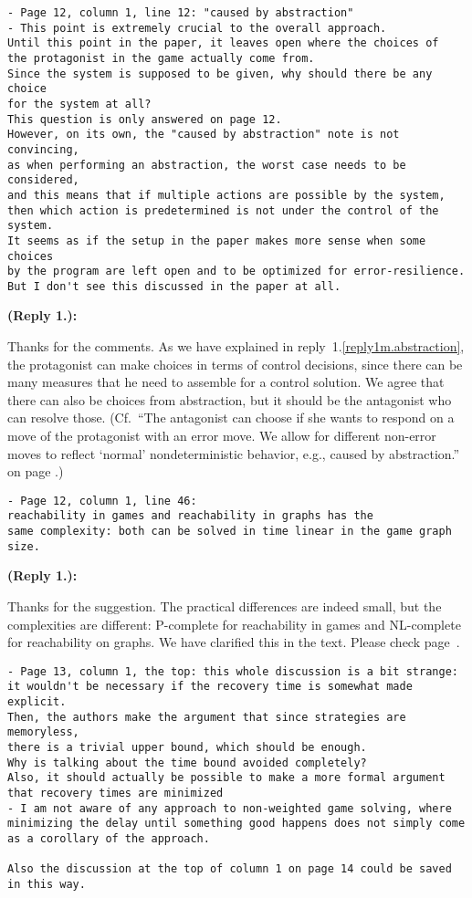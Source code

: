 \documentclass[times,10pt,twocolumn]{article}
\newcounter{cabbage0}
\newcounter{cabbage1}
\newcounter{cabbage2}
\newcounter{cabbage3}
\newcounter{bean0}
\newcounter{bean1}
\newcounter{bean2}
\newcounter{bean3}
\newcounter{bean4}
\newcounter{bean5}
\newcounter{bean6}
\newenvironment{reply1}{\begin{list}{\bf (Reply 1.\arabic{bean1}):} 
        {\usecounter{bean1}\setcounter{bean1}{\value{cabbage1}} \item \setcounter{cabbage1}{\value{bean1}} 
        }
}{\end{list}}
\begin{document}
\begin{verbatim} 
- Page 12, column 1, line 12: "caused by abstraction" 
- This point is extremely crucial to the overall approach. 
Until this point in the paper, it leaves open where the choices of 
the protagonist in the game actually come from. 
Since the system is supposed to be given, why should there be any choice 
for the system at all? 
This question is only answered on page 12. 
However, on its own, the "caused by abstraction" note is not convincing, 
as when performing an abstraction, the worst case needs to be considered, 
and this means that if multiple actions are possible by the system, 
then which action is predetermined is not under the control of the system. 
It seems as if the setup in the paper makes more sense when some choices 
by the program are left open and to be optimized for error-resilience. 
But I don't see this discussed in the paper at all.
\end{verbatim}
\begin{reply1}
Thanks for the comments. 
As we have explained in reply~1.\ref{reply1m.abstraction}, 
the protagonist can make choices in terms of control decisions, since there 
can be many measures that he need to assemble for a control solution. 
We agree that there can also be choices from abstraction, but it should be the antagonist who can resolve those.
(Cf.\
``The antagonist can choose if she wants to respond on a move of the protagonist with an error move.
We allow for different non-error moves to reflect `normal' nondeterministic behavior, e.g., caused by abstraction.'' on page \pageref{abstraction}.)

\end{reply1} 
\begin{verbatim} 
- Page 12, column 1, line 46: 
reachability in games and reachability in graphs has the 
same complexity: both can be solved in time linear in the game graph size.
\end{verbatim}
\begin{reply1}
Thanks for the suggestion. 
The practical differences are indeed small, but the complexities are different: P-complete for reachability in games and NL-complete for reachability on graphs.
We have clarified this in the text.
Please check page~\pageref{reply1.2.complexities}.  
\end{reply1} 
\begin{verbatim}
- Page 13, column 1, the top: this whole discussion is a bit strange: 
it wouldn't be necessary if the recovery time is somewhat made explicit. 
Then, the authors make the argument that since strategies are memoryless, 
there is a trivial upper bound, which should be enough. 
Why is talking about the time bound avoided completely? 
Also, it should actually be possible to make a more formal argument 
that recovery times are minimized 
- I am not aware of any approach to non-weighted game solving, where 
minimizing the delay until something good happens does not simply come 
as a corollary of the approach. 

Also the discussion at the top of column 1 on page 14 could be saved in this way.
\end{verbatim}
\end{document}
